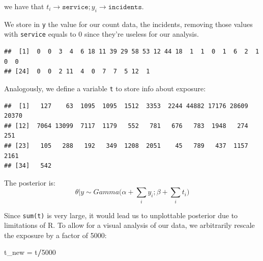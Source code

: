 \documentclass[]{article}
\newenvironment{Shaded}{\begin{snugshade}}{\end{snugshade}}
\newcommand{\DataTypeTok}[1]{\textcolor[rgb]{0.13,0.29,0.53}{#1}}
\newcommand{\DecValTok}[1]{\textcolor[rgb]{0.00,0.00,0.81}{#1}}
\newcommand{\StringTok}[1]{\textcolor[rgb]{0.31,0.60,0.02}{#1}}
\newcommand{\OperatorTok}[1]{\textcolor[rgb]{0.81,0.36,0.00}{\textbf{#1}}}
\newcommand{\NormalTok}[1]{#1}
\begin{document}
we have that
\(t_i \rightarrow \texttt{service}; y_i \rightarrow \texttt{incidents}\).

We store in \texttt{y} the value for our count data, the incidents,
removing those values with \texttt{service} equals to 0 since they're
useless for our analysis.

\begin{Shaded}
\end{Shaded}

\begin{verbatim}
##  [1]  0  0  3  4  6 18 11 39 29 58 53 12 44 18  1  1  0  1  6  2  1  0  0
## [24]  0  0  2 11  4  0  7  7  5 12  1
\end{verbatim}

Analogously, we define a variable \texttt{t} to store info about
exposure:

\begin{Shaded}
\end{Shaded}

\begin{verbatim}
##  [1]   127    63  1095  1095  1512  3353  2244 44882 17176 28609 20370
## [12]  7064 13099  7117  1179   552   781   676   783  1948   274   251
## [23]   105   288   192   349  1208  2051    45   789   437  1157  2161
## [34]   542
\end{verbatim}

The posterior is: \[
\theta|y \sim Gamma\bigg(\alpha+\sum_iy_i; \beta + \sum_i t_i\bigg)
\]

Since \texttt{sum(t)} is very large, it would lead us to unplottable
posterior due to limitations of R. To allow for a visual analysis of our
data, we arbitrarily rescale the exposure by a factor of 5000:

\begin{Shaded}
\begin{Highlighting}[]
\NormalTok{t_new =}\StringTok{ }\NormalTok{t}\OperatorTok{/}\DecValTok{5000}
\end{Highlighting}
\end{Shaded}
\end{document}
